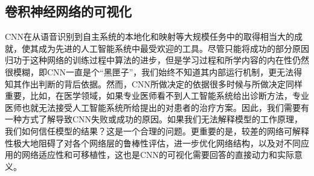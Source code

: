 \subsection{卷积神经网络的可视化}\label{subsec:visulization_methods}
CNN在从语音识别到自主系统的本地化和映射等大规模任务中的取得相当大的成就，使其成为先进的人工智能系统中最受欢迎的工具。尽管只能将成功的部分原因归功于这种网络的训练过程中算法的进步，但是学习过程和所学内容的内在性仍然很模糊，即CNN一直是个“黑匣子”，我们始终不知道其内部运行机制，更无法得知其作出判断的背后依据。然而，CNN所做决定的依据很多时候与所做决定同样重要，比如，在医学领域，如果专业医师看不到人工智能系统给出诊断方法，专业医师也就无法接受人工智能系统所给提出的对患者的治疗方案。因此，我们需要有一种方式了解导致CNN失败或成功的原因。如果我们无法解释模型的工作原理，我们如何信任模型的结果？这是一个合理的问题。更重要的是，较差的网络可解释性极大地阻碍了对各个网络层的鲁棒性评估，进一步优化网络结构，以及对不同应用的网络适应性和可移植性，这也是CNN的可视化需要回答的直接动力和实际意义。


